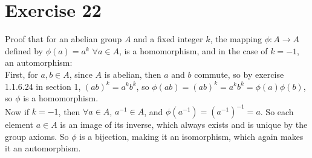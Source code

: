 \documentclass[12pt]{article}
\begin{document}
    \section*{Exercise 22}
    Proof that for an abelian group $A$ and a fixed integer $k$,
    the mapping $\phi: A \to A$ defined by $\phi(a) = a^k$ $\forall a \in A$,
    is a homomorphism, and in the case of $k = -1$, an automorphism: \\
    First, for $a, b \in A$,
    since $A$ is abelian, then $a$ and $b$ commute,
    so by exercise 1.1.6.24 in section 1, $(ab)^k = a^kb^k$,
    so $\phi(ab) = (ab)^k = a^kb^k = \phi(a)\phi(b)$,
    so $\phi$ is a homomorphism. \\
    Now if $k = -1$,
    then $\forall a \in A$, $a^{-1} \in A$,
    and $\phi(a^{-1}) = (a^{-1})^{-1} = a$.
    So each element $a \in A$ is an image of its inverse,
    which always exists and is unique by the group axioms.
    So $\phi$ is a bijection,
    making it an isomorphism,
    which again makes it an automorphism.
\end{document}
